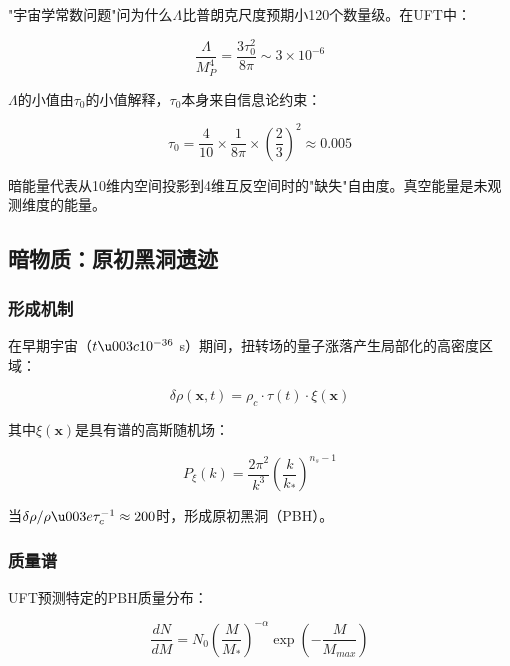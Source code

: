 "宇宙学常数问题"问为什么$\Lambda$比普朗克尺度预期小120个数量级。在UFT中：

\begin{equation}
    \frac{\Lambda}{M_P^4} = \frac{3\tau_0^2}{8\pi} \sim 3 \times 10^{-6}
\end{equation}

$\Lambda$的小值由$\tau_0$的小值解释，$\tau_0$本身来自信息论约束：

\begin{equation}
    \tau_0 = \frac{4}{10} \times \frac{1}{8\pi} \times \left(\frac{2}{3}\right)^2 \approx 0.005
\end{equation}

\begin{insight}[暗能量作为投影损失]
暗能量代表从10维内空间投影到4维互反空间时的"缺失"自由度。真空能量是未观测维度的能量。
\end{insight}

\subsection{暗物质：原初黑洞遗迹}

\subsubsection{形成机制}

在早期宇宙（$t \u003c 10^{-36}$ s）期间，扭转场的量子涨落产生局部化的高密度区域：

\begin{equation}
    \delta\rho(\mathbf{x}, t) = \rho_c \cdot \tau(t) \cdot \xi(\mathbf{x})
\end{equation}

其中$\xi(\mathbf{x})$是具有谱的高斯随机场：

\begin{equation}
    P_\xi(k) = \frac{2\pi^2}{k^3} \left(\frac{k}{k_*}\right)^{n_s-1}
\end{equation}

当$\delta\rho/\rho \u003e \tau_c^{-1} \approx 200$时，形成原初黑洞（PBH）。

\subsubsection{质量谱}

UFT预测特定的PBH质量分布：

\begin{equation}
    \frac{dN}{dM} = N_0 \left(\frac{M}{M_*}\right)^{-\alpha} \exp\left(-\frac{M}{M_{max}}\right)
\end{equation}

